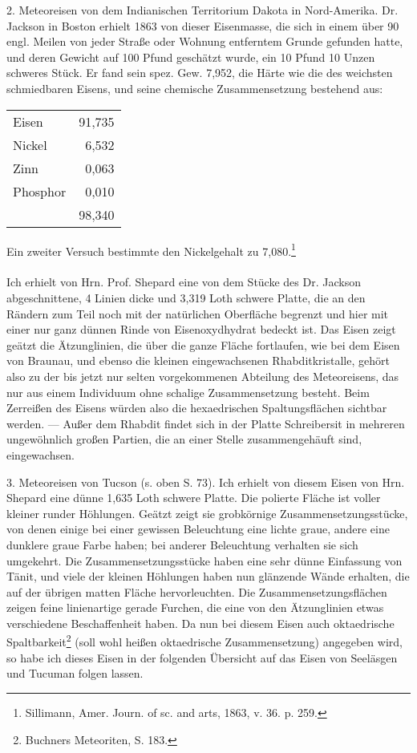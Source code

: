 \documentclass[a4paper, 11pt, oneside]{article}
\begin{document}
2. Meteoreisen von dem Indianischen Territorium Dakota in Nord-Amerika. Dr. Jackson in Boston erhielt 1863 von dieser Eisenmasse, die sich in einem über 90 engl. Meilen von jeder Straße oder Wohnung entferntem Grunde gefunden hatte, und deren Gewicht auf 100 Pfund geschätzt wurde, ein 10 Pfund 10 Unzen schweres Stück. Er fand sein spez. Gew. 7,952, die Härte wie die des weichsten schmiedbaren Eisens, und seine chemische Zusammensetzung bestehend aus:
\begin{center}
\begin{tabular}{ l r }
    Eisen & 91,735\\
    Nickel & 6,532\\
    Zinn & 0,063\\
    Phosphor & 0,010\\
     & 98,340\\
\end{tabular}
\end{center}
Ein zweiter Versuch bestimmte den Nickelgehalt zu 7,080.\footnote{Sillimann, Amer. Journ. of sc. and arts, 1863, v. 36. p. 259.}
\paragraph{}
Ich erhielt von Hrn. Prof. Shepard eine von dem Stücke des Dr. Jackson abgeschnittene, 4 Linien dicke und 3,319 Loth schwere Platte, die an den Rändern zum Teil noch mit der natürlichen Oberfläche begrenzt und hier mit einer nur ganz dünnen Rinde von Eisenoxydhydrat bedeckt ist. Das Eisen zeigt geätzt die Ätzunglinien, die über die ganze Fläche fortlaufen, wie bei dem Eisen von Braunau, und ebenso die kleinen eingewachsenen Rhabditkristalle, gehört also zu der bis jetzt nur selten vorgekommenen Abteilung des Meteoreisens, das nur aus einem Individuum ohne schalige Zusammensetzung besteht. Beim Zerreißen des Eisens würden also die hexaedrischen Spaltungsflächen sichtbar werden. --- Außer dem Rhabdit findet sich in der Platte Schreibersit in mehreren ungewöhnlich großen Partien, die an einer Stelle zusammengehäuft sind, eingewachsen.

3. Meteoreisen von Tucson (s. oben S. 73). Ich erhielt von diesem Eisen von Hrn. Shepard eine dünne 1,635 Loth schwere Platte. Die polierte Fläche ist voller kleiner runder Höhlungen. Geätzt zeigt sie grobkörnige Zusammensetzungsstücke, von denen einige bei einer gewissen Beleuchtung eine lichte graue, andere eine dunklere graue Farbe haben; bei anderer Beleuchtung verhalten sie sich umgekehrt. Die Zusammensetzungsstücke haben eine sehr dünne Einfassung von Tänit, und viele der kleinen Höhlungen haben nun glänzende Wände erhalten, die auf der übrigen matten Fläche hervorleuchten. Die Zusammensetzungsflächen zeigen feine linienartige gerade Furchen, die eine von den Ätzunglinien etwas verschiedene Beschaffenheit haben. Da nun bei diesem Eisen auch oktaedrische Spaltbarkeit\footnote{Buchners Meteoriten, S. 183.} (soll wohl heißen oktaedrische Zusammensetzung) angegeben wird, so habe ich dieses Eisen in der folgenden Übersicht auf das Eisen von Seeläsgen und Tucuman folgen lassen.
\end{document}
